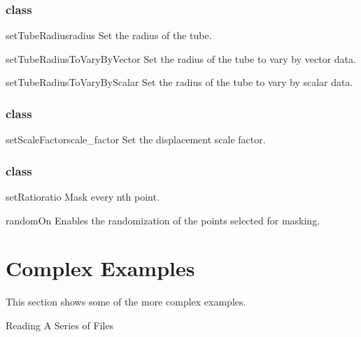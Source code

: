 \subsubsection{\Tube class}

\begin{methoddesc}[Tube]{setTubeRadius}{radius}
Set the radius of the tube.
\end{methoddesc}

\begin{methoddesc}[Tube]{setTubeRadiusToVaryByVector}{}
Set the radius of the tube to vary by vector data.
\end{methoddesc}

\begin{methoddesc}[Tube]{setTubeRadiusToVaryByScalar}{}
Set the radius of the tube to vary by scalar data.
\end{methoddesc}

\subsubsection{\Warp class}

\begin{methoddesc}[Warp]{setScaleFactor}{scale_factor}
Set the displacement scale factor.
\end{methoddesc}

\subsubsection{\MaskPoints class}

\begin{methoddesc}[MaskPoints]{setRatio}{ratio}
Mask every nth point.
\end{methoddesc}

\begin{methoddesc}[MaskPoints]{randomOn}{}
Enables the randomization of the points selected for masking.
\end{methoddesc}




\section{Complex Examples}
This section shows some of the more complex examples.

\textsf{Reading A Series of Files}

